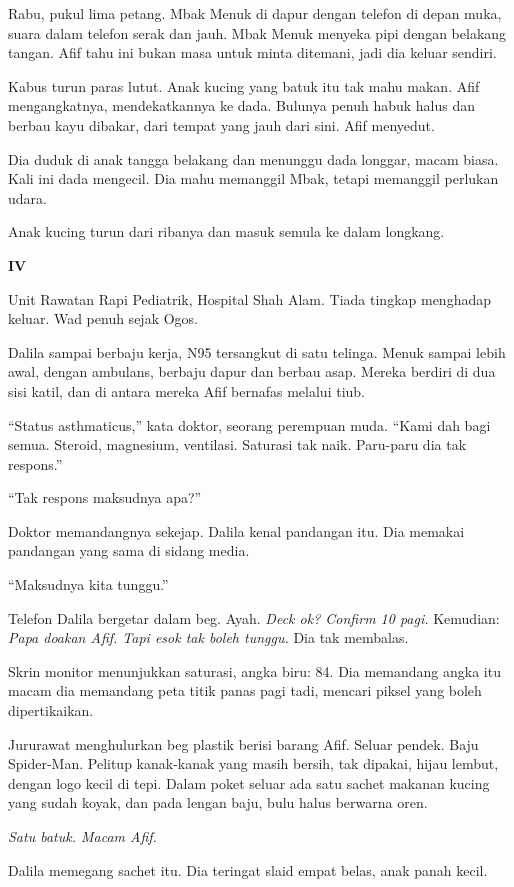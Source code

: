 \documentclass[
  11pt,
  a5paper,
  openany,
  oneside]{book}
\begin{document}
Rabu, pukul lima petang. Mbak Menuk di dapur dengan telefon di depan
muka, suara dalam telefon serak dan jauh. Mbak Menuk menyeka pipi dengan
belakang tangan. Afif tahu ini bukan masa untuk minta ditemani, jadi dia
keluar sendiri.

Kabus turun paras lutut. Anak kucing yang batuk itu tak mahu makan. Afif
mengangkatnya, mendekatkannya ke dada. Bulunya penuh habuk halus dan
berbau kayu dibakar, dari tempat yang jauh dari sini. Afif menyedut.

Dia duduk di anak tangga belakang dan menunggu dada longgar, macam
biasa. Kali ini dada mengecil. Dia mahu memanggil Mbak, tetapi memanggil
perlukan udara.

Anak kucing turun dari ribanya dan masuk semula ke dalam longkang.

\textbf{IV}

Unit Rawatan Rapi Pediatrik, Hospital Shah Alam. Tiada tingkap menghadap
keluar. Wad penuh sejak Ogos.

Dalila sampai berbaju kerja, N95 tersangkut di satu telinga. Menuk
sampai lebih awal, dengan ambulans, berbaju dapur dan berbau asap.
Mereka berdiri di dua sisi katil, dan di antara mereka Afif bernafas
melalui tiub.

``Status asthmaticus,'' kata doktor, seorang perempuan muda. ``Kami dah
bagi semua. Steroid, magnesium, ventilasi. Saturasi tak naik. Paru-paru
dia tak respons.''

``Tak respons maksudnya apa?''

Doktor memandangnya sekejap. Dalila kenal pandangan itu. Dia memakai
pandangan yang sama di sidang media.

``Maksudnya kita tunggu.''

Telefon Dalila bergetar dalam beg. Ayah. \emph{Deck ok? Confirm 10
pagi.} Kemudian: \emph{Papa doakan Afif. Tapi esok tak boleh tunggu.}
Dia tak membalas.

Skrin monitor menunjukkan saturasi, angka biru: 84. Dia memandang angka
itu macam dia memandang peta titik panas pagi tadi, mencari piksel yang
boleh dipertikaikan.

Jururawat menghulurkan beg plastik berisi barang Afif. Seluar pendek.
Baju Spider-Man. Pelitup kanak-kanak yang masih bersih, tak dipakai,
hijau lembut, dengan logo kecil di tepi. Dalam poket seluar ada satu
sachet makanan kucing yang sudah koyak, dan pada lengan baju, bulu halus
berwarna oren.

\emph{Satu batuk. Macam Afif.}

Dalila memegang sachet itu. Dia teringat slaid empat belas, anak panah
kecil.
\end{document}
